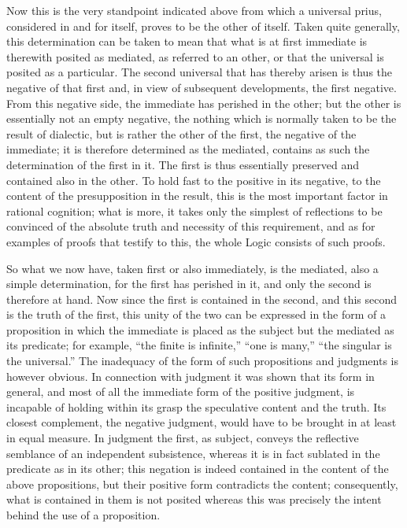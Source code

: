 Now this is the very standpoint indicated above
from which a universal prius,
considered in and for itself,
proves to be the other of itself.
Taken quite generally, this determination
can be taken to mean that what is at first immediate
is therewith posited as mediated, as referred to an other,
or that the universal is posited as a particular.
The second universal that has thereby arisen is
thus the negative of that first
and, in view of subsequent developments, the first negative.
From this negative side, the immediate has perished in the other;
but the other is essentially not an empty negative,
the nothing which is normally taken to be the result of dialectic,
but is rather the other of the first,
the negative of the immediate;
it is therefore determined as the mediated,
contains as such the determination of the first in it.
The first is thus essentially preserved and contained also in the other.
To hold fast to the positive in its negative,
to the content of the presupposition in the result,
this is the most important factor in rational cognition;
what is more, it takes only the simplest of reflections
to be convinced of the absolute truth and necessity of this requirement,
and as for examples of proofs that testify to this,
the whole Logic consists of such proofs.

So what we now have, taken first or also immediately, is the mediated,
also a simple determination,
for the first has perished in it,
and only the second is therefore at hand.
Now since the first is contained in the second,
and this second is the truth of the first,
this unity of the two can be expressed
in the form of a proposition in which
the immediate is placed as the subject
but the mediated as its predicate;
for example, “the finite is infinite,”
“one is many,” “the singular is the universal.”
The inadequacy of the form of such
propositions and judgments is however obvious.
In connection with judgment it was shown that its form in general,
and most of all the immediate form of the positive judgment,
is incapable of holding within its grasp
the speculative content and the truth.
Its closest complement, the negative judgment,
would have to be brought in at least in equal measure.
In judgment the first, as subject, conveys the
reflective semblance of an independent subsistence,
whereas it is in fact sublated in the predicate as in its other;
this negation is indeed contained in
the content of the above propositions,
but their positive form contradicts the content;
consequently, what is contained in them is not posited
whereas this was precisely the intent
behind the use of a proposition.

